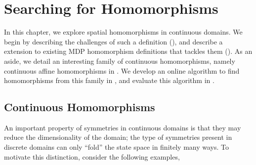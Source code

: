 \chapter{Searching for Homomorphisms}
\label{chap:hf}

In this chapter, we explore spatial homomorphisms in continuous domains.
We begin by describing the challenges of such a definition
(), and describe a extension to existing
MDP homomorphism definitions that tackles them
(). As an aside, we detail an interesting
family of continuous homomorphisms, namely continuous affine
homomorphisms in . We develop an online algorithm
to find homomorphisms from this family in
, and evaluate this algorithm in
.

\section{Continuous Homomorphisms}
\label{sec:hf:continuous-hom}

An important property of symmetries in continuous domains is that they
may reduce the dimensionality of the domain; the type of symmetries
present in discrete domains can only ``fold'' the state space in
finitely many ways. To motivate this distinction, consider the following
examples,

\begin{figure}[h]
  \centering
   \hspace{0.5in} 
\end{figure}

